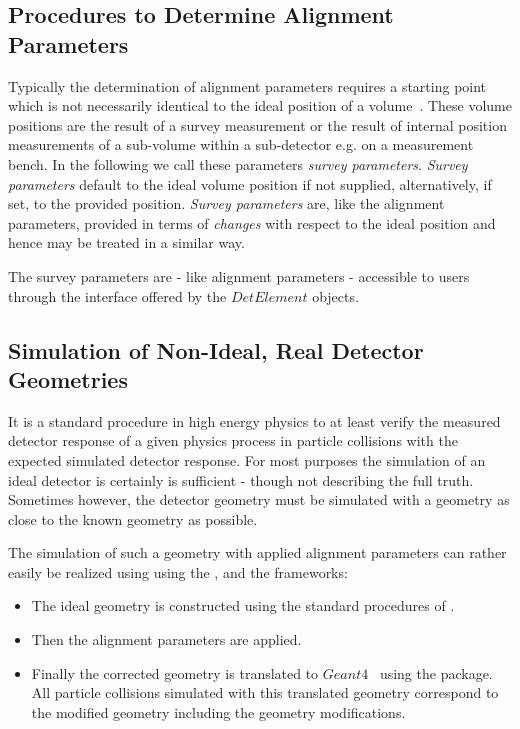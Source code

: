\documentclass[10pt,a4paper]{article}
\begin{document}
\subsection{Procedures to Determine Alignment Parameters}
\label{subsect:ddalign-intro-determine-alignment-params}
\noindent
Typically the determination of alignment parameters requires a starting point
which is not necessarily identical to the ideal position of a 
volume~\cite{bib:chris-parkes-priv-comm}. These volume positions are the result
of a survey measurement or the result of internal position measurements 
of a sub-volume within a sub-detector e.g. on a measurement bench.
In the following we call these parameters {\it{survey parameters}}. 
{\it{Survey parameters}} default to the ideal volume position if not supplied,
alternatively, if set, to the provided position. {\it{Survey parameters}}
are, like the alignment parameters, provided in terms of {\it{changes}} with 
respect to the ideal position and hence may be treated in a similar way.

\noindent 
The survey parameters are - like alignment parameters - accessible to users
through the interface offered by the $DetElement$ objects.

\subsection{Simulation of Non-Ideal, Real Detector Geometries}
\label{subsect:ddalign-intro-simulate-misaligned-geometries}
\noindent
It is a standard procedure in high energy physics to at least verify 
the measured detector response of a given physics process in particle 
collisions with the expected simulated detector response.
For most purposes the simulation of an ideal detector is certainly is
sufficient - though not describing the full truth. Sometimes however, the
detector geometry must be simulated with a geometry as close to the 
known geometry as possible.

\noindent
The simulation of such a geometry with applied alignment parameters can 
rather easily be realized using using the \DDhep, \DDA and the \DDG frameworks:
\begin{itemize}\itemcompact
\item The ideal geometry is constructed using the standard procedures
    of \DDhep\cite{bib:DD4hep}.
\item Then the alignment parameters are applied.
\item Finally the corrected geometry is translated to $Geant4$~\cite{bib:geant4}
    using the \DDG\cite{bib:DDG4} package.
    All particle collisions simulated with this translated geometry 
    correspond to the modified geometry including the geometry modifications.
\end{itemize}
\end{document}
